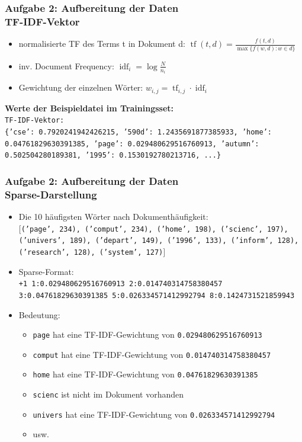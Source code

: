 \documentclass[accentcolor=tud7b,noresetcounter]{tudbeamer}
\begin{document}
	\begin{frame}
		\frametitle{Aufgabe 2: Aufbereitung der Daten\\TF-IDF-Vektor}
		\begin{itemize}
			\item normalisierte TF des Terms t in Dokument d: $\operatorname{tf}(t,d) = \frac{f(t, d)}{\max\{f(w, d):w \in d\}}$
			\item inv. Document Frequency: $\operatorname{idf}_i = \log \frac{N}{n_i}$
			\item Gewichtung der einzelnen Wörter: $w_{i,j} = \operatorname{tf}_{i,j} \cdot \operatorname{idf}_i$
		\end{itemize}
		
		\textbf{Werte der Beispieldatei im Trainingsset:}\\
		\texttt{TF-IDF-Vektor:}\\
		\texttt{\{'cse': 0.7920241942426215, '590d': 1.2435691877385933, 'home': 0.04761829630391385, 'page': 0.029480629516760913, 'autumn': 0.502504280189381, '1995': 0.1530192780213716, ...\}}
	\end{frame}
	
	\begin{frame}
		\frametitle{Aufgabe 2: Aufbereitung der Daten\\Sparse-Darstellung}
		\begin{itemize}
			\item Die 10 häufigsten Wörter nach Dokumenthäufigkeit:\\
			\texttt{$\lbrack$('page', 234), ('comput', 234), ('home', 198), ('scienc', 197), ('univers', 189), ('depart', 149), ('1996', 133), ('inform', 128), ('research', 128), ('system', 127)$\rbrack$}
			
			\item Sparse-Format:\\
			\texttt{+1 1:0.029480629516760913 2:0.014740314758380457 3:0.04761829630391385 5:0.026334571412992794 8:0.1424731521859943}
			\item Bedeutung:
			\begin{itemize}
 				\item \texttt{page} hat eine TF-IDF-Gewichtung von \texttt{0.029480629516760913}
 				\item \texttt{comput} hat eine TF-IDF-Gewichtung von \texttt{0.014740314758380457}
 				\item \texttt{home} hat eine TF-IDF-Gewichtung von \texttt{0.04761829630391385}
 				\item \texttt{scienc} ist nicht im Dokument vorhanden
 				\item \texttt{univers} hat eine TF-IDF-Gewichtung von \texttt{0.026334571412992794}
 				\item usw.
			\end{itemize}
		\end{itemize}
	\end{frame}


\end{document}
